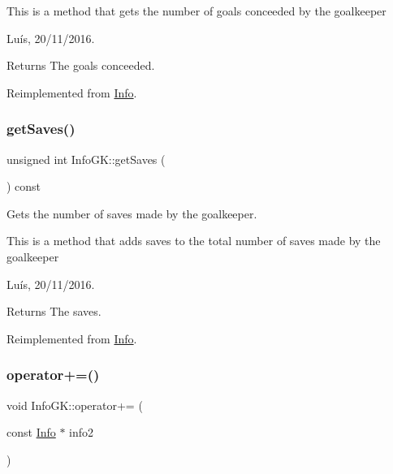 This is a method that gets the number of goals conceeded by the goalkeeper

Luís, 20/11/2016. 

\begin{DoxyReturn}{Returns}
The goals conceeded. 
\end{DoxyReturn}


Reimplemented from \hyperlink{class_info_a41d954fad291a5ffdfe29cb1cf3f75ce}{Info}.

\hypertarget{class_info_g_k_a5690b8056b8f30b5127f99b46ef9a5d9}{}\label{class_info_g_k_a5690b8056b8f30b5127f99b46ef9a5d9} 
\subsubsection{\texorpdfstring{get\+Saves()}{getSaves()}}
{\footnotesize\ttfamily unsigned int Info\+G\+K\+::get\+Saves (\begin{DoxyParamCaption}{ }\end{DoxyParamCaption}) const\hspace{0.3cm}{\ttfamily [virtual]}}



Gets the number of saves made by the goalkeeper. 

This is a method that adds saves to the total number of saves made by the goalkeeper

Luís, 20/11/2016. 

\begin{DoxyReturn}{Returns}
The saves. 
\end{DoxyReturn}


Reimplemented from \hyperlink{class_info_a2d7c53d322a705aaeb08fb79f9ef5211}{Info}.

\hypertarget{class_info_g_k_a1554aaf307cb45226fb26c6d6380a47e}{}\label{class_info_g_k_a1554aaf307cb45226fb26c6d6380a47e} 
\subsubsection{\texorpdfstring{operator+=()}{operator+=()}}
{\footnotesize\ttfamily void Info\+G\+K\+::operator+= (\begin{DoxyParamCaption}\item[{const \hyperlink{class_info}{Info} $\ast$}]{info2 }\end{DoxyParamCaption})\hspace{0.3cm}{\ttfamily [virtual]}}



